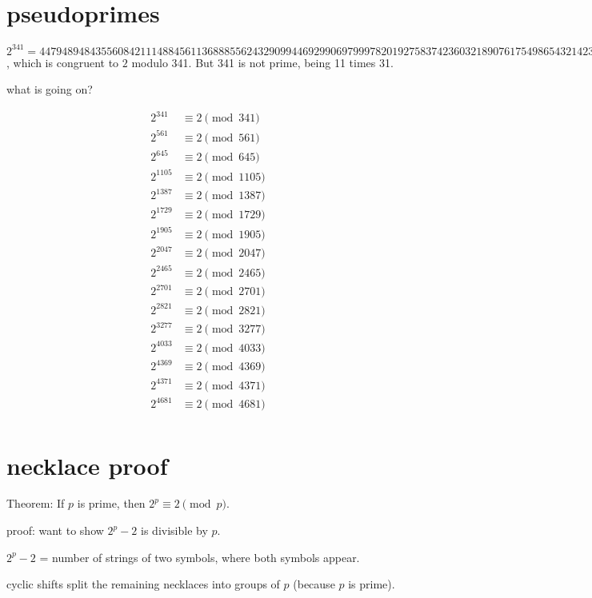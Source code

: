 \documentclass[12pt]{handout}
\begin{document}
\section*{pseudoprimes}

$2^{341} =
4479489484355608421114884561136888556243290994469299069799978201927583742360321890761754986543214231552$, which is congruent to $2$ modulo 341.  But 341 is not prime, being 11 times 31.

what is going on?

\begin{align*}
2^{341} &\equiv 2 \pmod{341} \\
2^{561} &\equiv 2 \pmod{561} \\
2^{645} &\equiv 2 \pmod{645} \\
2^{1105} &\equiv 2 \pmod{1105} \\
2^{1387} &\equiv 2 \pmod{1387} \\
2^{1729} &\equiv 2 \pmod{1729} \\
2^{1905} &\equiv 2 \pmod{1905} \\
2^{2047} &\equiv 2 \pmod{2047} \\
2^{2465} &\equiv 2 \pmod{2465} \\
2^{2701} &\equiv 2 \pmod{2701} \\
2^{2821} &\equiv 2 \pmod{2821} \\
2^{3277} &\equiv 2 \pmod{3277} \\
2^{4033} &\equiv 2 \pmod{4033} \\
2^{4369} &\equiv 2 \pmod{4369} \\
2^{4371} &\equiv 2 \pmod{4371} \\
2^{4681} &\equiv 2 \pmod{4681} \\
\end{align*}

\section*{necklace proof}

Theorem: If $p$ is prime, then $2^p \equiv 2 \pmod p$.

proof: want to show $2^p - 2$ is divisible by $p$.

$2^p - 2$ = number of strings of two symbols, where both symbols appear.

cyclic shifts split the remaining necklaces into groups of $p$ (because $p$ is prime).

\end{document}
